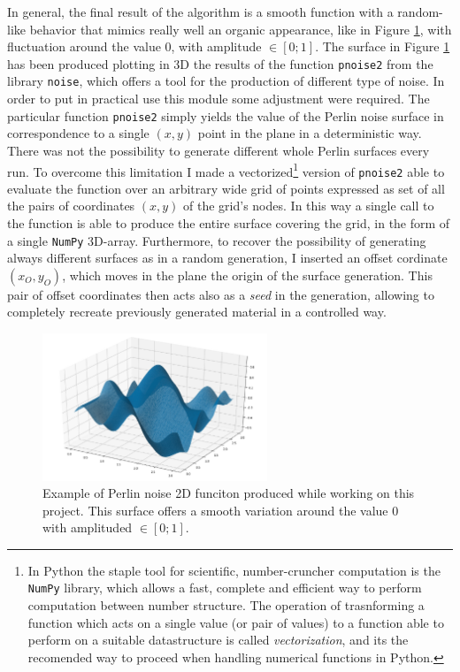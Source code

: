 \documentclass[12pt,a4paper]{report}
\begin{document}
    In general, the final result of the algorithm is a smooth function with a random-like behavior that mimics really well an organic appearance, like in Figure \ref{fig:my_perlin}, with fluctuation around the value 0, with amplitude $ \in [ 0;1] $. The surface in Figure \ref{fig:my_perlin} has been produced plotting in 3D the results of the function \texttt{pnoise2} from the library \texttt{noise}, which offers a tool for the production of different type of noise. In order to put in practical use this module some adjustment were required. The particular function \texttt{pnoise2} simply yields the value of the Perlin noise surface in correspondence to a single $(x,y)$ point in the plane in a deterministic way. There was not the possibility to generate different whole Perlin surfaces every run. To overcome this limitation I made a vectorized\footnote{In Python the staple tool for scientific, number-cruncher computation is the \texttt{NumPy} library, which allows a fast, complete and efficient way to perform computation between number structure. The operation of trasnforming a function which acts on a single value (or pair of values) to a function able to perform on a suitable datastructure is called \textit{vectorization}, and its the recomended way to proceed when handling numerical functions in Python.} version of \texttt{pnoise2} able to evaluate the function over an arbitrary wide grid of points expressed as set of all the pairs of coordinates $(x,y)$ of the grid's nodes. In this way a single call to the function is able to produce the entire surface covering the grid, in the form of a single \texttt{NumPy} 3D-array. Furthermore, to recover the possibility of generating always different surfaces as in a random generation, I inserted an offset cordinate $(x_O,y_O)$, which moves in the plane the origin of the surface generation. This pair of offset coordinates then acts also as a \textit{seed} in the generation, allowing to completely recreate previously generated material in a controlled way.

    \begin{figure}
        \centering
        \includegraphics[width = 0.6\textwidth]{images/perlin}
        \caption{Example of Perlin noise 2D funciton produced while working on this project. This surface offers a smooth variation around the value 0 with amplituded $ \in [ 0;1] $.}
        \label{fig:my_perlin}
    \end{figure}
\end{document}
